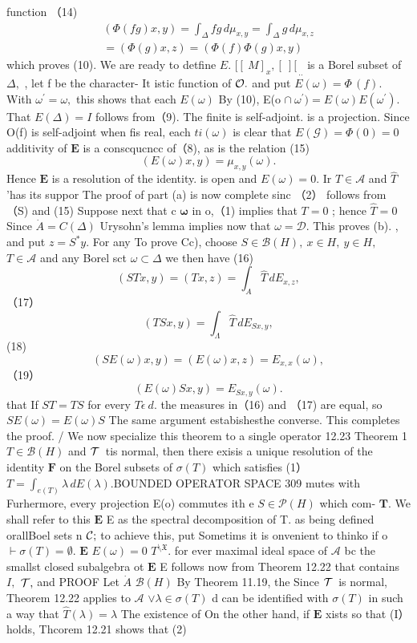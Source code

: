 function （14) $$ \begin{array}{c}{{(\Phi(f g)x,y)=\int_{\Delta}f g\,d\mu_{x,y}=\int_{\Delta}g\,d\mu_{x,z}}}\\ {{=(\Phi(g)x,z)=(\Phi(f)\Phi(g)x,y)}}\end{array} $$ which proves (10). We are ready to detfine $E.$ $[\![\ M]_{x},[\:]\!\![\frac{}{}_{..\!}$ is a Borel subset of $\Delta,$ , let f be the character- $\mathrm{{It}}$ istic function of ${\cal O}.$ and put $E(\omega)=\Phi\,(f).$ With $\omega^{\prime}=\omega,$ this shows that each $\scriptstyle{E(\omega)}$ By (10), E(o $\cap\ \omega^{\prime})=E(\omega)E(\omega^{\prime}).$ That $E(\Delta)=I$ follows from（9). The finite is self-adjoint. is a projection. Since O(f) is self-adjoint when fis real, each $\scriptstyle t i(\omega)$ is clear that $E({\mathcal{G}})=\Phi(0)=0$ additivity of ${\boldsymbol{E}}$ is a conscqucncc of（8), as is the relation (15) $$ (E(\omega)x,y)=\mu_{x,y}(\omega). $$ Hence ${\boldsymbol{E}}$ is a resolution of the identity. is open and $E(\omega)=0.$ Ir $T\in{\mathcal{A}}$ and ${\hat{T}}$ 'has its suppor The proof of part (a) is now complete sinc （2） follows from （S) and (15) Suppose next that c ${\boldsymbol{\omega}}$ in o,（1) implies that $T=0$ ; hence ${\hat{T}}=0$ Since ${\dot{A}}=C(\Delta)$ Urysohn's lemma implies now that $\omega={\mathcal{D}}.$ This proves (b). , and put $z=S^{*}y.$ For any To prove Cc), choose $S\in{\mathcal{B}}(H),\ x\in H,\ y\in H,$ $\scriptstyle T\in{\mathcal{A}}$ and any Borel sct $\omega\subset\Delta$ we then have (16) $$ (S T x,y)=(T x,z)=\int_{A}{\hat{T}}\,d E_{x,z}, $$ （17） $$ (T S x,y)=\int_{\Lambda}{\hat{T}}\,d E_{S x,y}, $$ (18) $$ (S E(\omega)x,y)=(E(\omega)x,z)=E_{x,x}(\omega), $$ （19） $$ (E(\omega)S x,y)=E_{S x,y}(\omega). $$ that If $S T=T S$ for every $T\epsilon\ d.$ the measures in（16) and （17) are equal, so $S E(\omega)=E(\omega)S$ The same argument estabishesthe converse. This completes the proof. / We now specialize this theorem to a single operator 12.23 Theorem 1 $T\in{\mathcal{B}}(H)$ and ${\cal T}\,$ tis normal, then there exisis a unique resolution of the identity ${\boldsymbol{F}}$ on the Borel subsets of $\scriptstyle{\sigma(T)}$ which satisfies (1） $T=\int_{e(T)}\lambda\,d E(\lambda).$BOUNDED OPERATOR SPACE 309 mutes with Furhermore, every projection E(o) commutes ith e $S\in{\mathcal{P}}(H)$ which com- ${\boldsymbol{T}}.$ We shall refer to this $\boldsymbol{E}$ E as the spectral decomposition of T. as being defined orallBoel sets n ${\cal{C}};$ to achieve this, put Sometims it is onvenient to thinko if o $\vdash\sigma(T)=\emptyset.$ $\boldsymbol{E}$ $E(\omega)=0$ $T^{\setminus{\mathfrak{X}}}.$ for ever maximal ideal space of $\textstyle{\mathcal{A}}$ bc the smallst closed subalgebra ot $\boldsymbol{E}$ E follows now from Theorem 12.22 that contains ${\mathit{I}},$ ${\cal T},$ and PROOF Let $\scriptstyle{\dot{A}}$ ${\mathcal{B}}(H)$ By Theorem 11.19, the Since ${\cal T}\,$ is normal, Theorem 12.22 applies to $\scriptstyle{\mathcal{A}}$ $\vee\lambda\in\sigma(T)$ d can be identified with $\sigma(T)$ in such a way that ${\hat{T}}(\lambda)=\lambda$ The existence of On the other hand, if ${\boldsymbol{E}}$ xists so that (I） holds, Thcorem 12.21 shows that (2) $$ 
